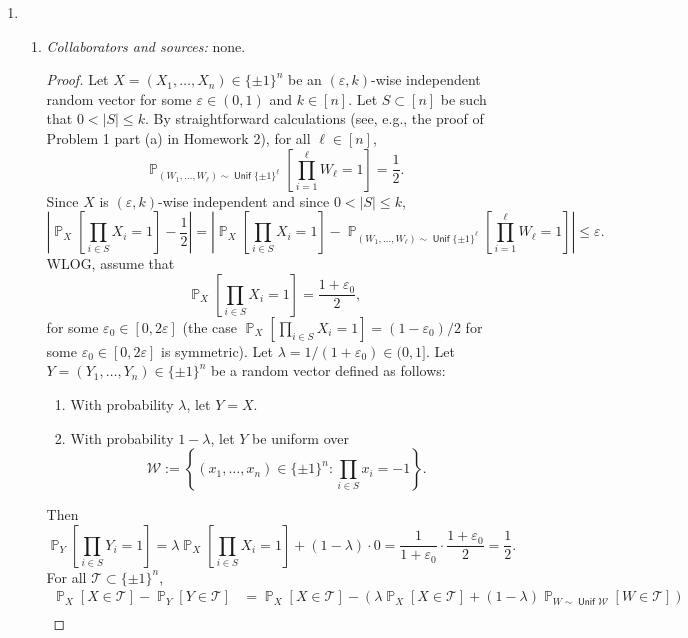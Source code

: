 \documentclass[letterpaper, reqno,11pt]{article}
\newcommand{\PP}{\mathop{{}\mathbb{P}}}
\DeclareMathOperator{\Unif}{\mathsf{Unif}}
\begin{document}
\begin{enumerate}
  \clearpage

  \item \begin{enumerate}
    \item \noindent\emph{Collaborators and sources:} none.
    
    \begin{proof}
      Let $X = (X_1, \ldots, X_n) \in \{ \pm 1 \}^n$ be an $(\varepsilon, k)$-wise independent random vector for some $\varepsilon \in (0, 1)$ and $k \in [n]$. Let $S \subset [n]$ be such that $0 < |S| \leq k$. By straightforward calculations (see, e.g., the proof of Problem 1 part (a) in Homework 2), for all $\ell \in [n]$,
      $$ \PP_{\left(W_1, \ldots, W_\ell\right) \sim \Unif\{ \pm 1 \}^\ell}\left[\prod_{i = 1}^\ell W_\ell = 1\right] = \frac{1}{2}. $$
      Since $X$ is $(\varepsilon, k)$-wise independent and since $0 < |S| \leq k$,
      $$ \left|\PP_X\left[\prod_{i \in S} X_i = 1\right] - \frac{1}{2}\right| = \left|\PP_X\left[\prod_{i \in S} X_i = 1\right] - \PP_{\left(W_1, \ldots, W_\ell\right) \sim \Unif\{ \pm 1 \}^\ell}\left[\prod_{i = 1}^\ell W_\ell = 1\right]\right| \leq \varepsilon. $$
      WLOG, assume that
      $$ \PP_X\left[\prod_{i \in S} X_i = 1\right] = \frac{1 + \varepsilon_0}{2}, $$
      for some $\varepsilon_0 \in [0, 2\varepsilon]$ (the case $\PP_X[\prod_{i \in S} X_i = 1] = (1 - \varepsilon_0)/2$ for some $\varepsilon_0 \in [0, 2\varepsilon]$ is symmetric). Let $\lambda = 1/(1 + \varepsilon_0) \in (0, 1]$. Let $Y = (Y_1, \ldots, Y_n) \in \{ \pm 1 \}^n$ be a random vector defined as follows:
      \begin{enumerate}[label=(\roman*), itemsep=0pt]
        \item With probability $\lambda$, let $Y = X$.
        \item With probability $1 - \lambda$, let $Y$ be uniform over
        \begin{equation} \label{eq:4b-case2}
          \mathcal W := \left\{ \left(x_1, \ldots, x_n\right) \in \{ \pm 1 \}^n : \prod_{i \in S} x_i = -1 \right\}.
        \end{equation}
      \end{enumerate}
      Then
      $$ \PP_Y\left[\prod_{i \in S} Y_i = 1\right] = \lambda \PP_X\left[\prod_{i \in S} X_i = 1\right] + (1 - \lambda) \cdot 0 = \frac{1}{1 + \varepsilon_0} \cdot \frac{1 + \varepsilon_0}{2} = \frac{1}{2}. $$
      For all $\mathcal T \subset \{ \pm 1 \}^n$,
      \begin{align*}
        \PP_X[X \in \mathcal T] - \PP_Y[Y \in \mathcal T] &= \PP_X[X \in \mathcal T] - \left(\lambda \PP_X[X \in \mathcal T] + (1 - \lambda) \PP_{W \sim \Unif \mathcal W}[W \in \mathcal T]\right) \\

\end{align*}
\end{proof}
\end{enumerate}
\end{enumerate}
\end{document}
